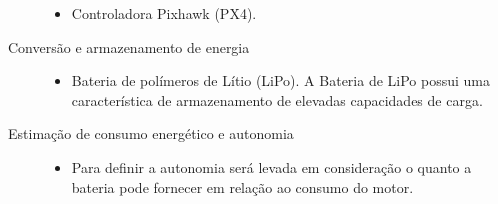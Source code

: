 \begin{description}
\begin{itemize}
  		\item Controladora Pixhawk (PX4).
  	\end{itemize}
  \item[Conversão e armazenamento de energia] \hfill 
  	\begin{itemize}
  		\item Bateria de polímeros de Lítio (LiPo). A Bateria de LiPo possui uma característica de armazenamento de elevadas capacidades de carga.
  	\end{itemize}
  \item[Estimação de consumo energético e autonomia] \hfill 
  	\begin{itemize}
  		\item Para definir a autonomia será levada em consideração o quanto a bateria pode fornecer em relação ao consumo do motor. 
  	\end{itemize}
\end{description}